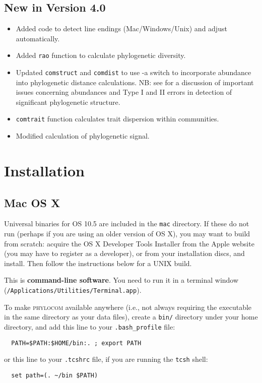 \documentclass[12pt,letterpaper]{article}
\begin{document}
\subsection{New in Version 4.0}

\begin{itemize}
 \item Added code to detect line endings (Mac/Windows/Unix) and adjust
   automatically.
 \item Added \verb|rao| function to calculate phylogenetic diversity.
 \item Updated  \verb|comstruct| and  \verb|comdist| to use -a switch
to incorporate abundance into phylogenetic distance calculations.  NB:
see \citet{hardy2008tes} for a discussion of important issues
concerning abundances and Type I and II errors in detection of significant
phylogenetic structure.
 \item  \verb|comtrait| function calculates trait dispersion within communities.
 \item Modified calculation of phylogenetic signal.
\end{itemize}

\section{Installation}

\subsection{Mac OS X}

Universal binaries for OS 10.5 are included in the \verb|mac|
directory. If these do not run (perhaps if you are using an older
version of OS X), you may want to build from scratch: acquire the OS X
Developer Tools Installer from the Apple website (you may have to
register as a developer), or from your installation discs, and
install.  Then follow the instructions below for a UNIX build.

This is {\bf command-line software}. You need to run it in a terminal
window (\verb|/Applications/|\-\verb|Utilities/|\-\verb|Terminal.app|).

To make {\scshape phylocom} available anywhere (i.e., not always
requiring the executable in the same directory as your data files),
create a \verb|bin/| directory under your home directory, and add this
line to your \verb|.bash_profile| file:
\begin{verbatim}
  PATH=$PATH:$HOME/bin:. ; export PATH
\end{verbatim}
or this line to your \verb|.tcshrc| file, if you are running the
\verb|tcsh| shell:
\begin{verbatim}
  set path=(. ~/bin $PATH)
\end{verbatim}
\end{document}
